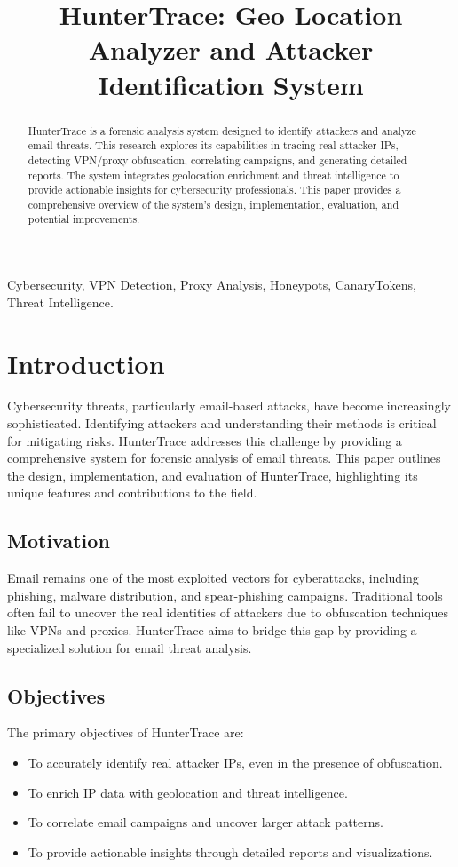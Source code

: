 \documentclass[conference]{IEEEtran}
\title{HunterTrace: Geo Location Analyzer and Attacker Identification System}
\author{
\IEEEauthorblockN{Anonymous Authors}
\IEEEauthorblockA{Affiliation Placeholder\\
Email Placeholder}
}
\begin{document}
\maketitle

\begin{abstract}
HunterTrace is a forensic analysis system designed to identify attackers and analyze email threats. This research explores its capabilities in tracing real attacker IPs, detecting VPN/proxy obfuscation, correlating campaigns, and generating detailed reports. The system integrates geolocation enrichment and threat intelligence to provide actionable insights for cybersecurity professionals. This paper provides a comprehensive overview of the system's design, implementation, evaluation, and potential improvements.
\end{abstract}

\begin{IEEEkeywords}
Cybersecurity, VPN Detection, Proxy Analysis, Honeypots, CanaryTokens, Threat Intelligence.
\end{IEEEkeywords}

\section{Introduction}
Cybersecurity threats, particularly email-based attacks, have become increasingly sophisticated. Identifying attackers and understanding their methods is critical for mitigating risks. HunterTrace addresses this challenge by providing a comprehensive system for forensic analysis of email threats. This paper outlines the design, implementation, and evaluation of HunterTrace, highlighting its unique features and contributions to the field.

\subsection{Motivation}
Email remains one of the most exploited vectors for cyberattacks, including phishing, malware distribution, and spear-phishing campaigns. Traditional tools often fail to uncover the real identities of attackers due to obfuscation techniques like VPNs and proxies. HunterTrace aims to bridge this gap by providing a specialized solution for email threat analysis.

\subsection{Objectives}
The primary objectives of HunterTrace are:
\begin{itemize}
    \item To accurately identify real attacker IPs, even in the presence of obfuscation.
    \item To enrich IP data with geolocation and threat intelligence.
    \item To correlate email campaigns and uncover larger attack patterns.
    \item To provide actionable insights through detailed reports and visualizations.
\end{itemize}
\end{document}

